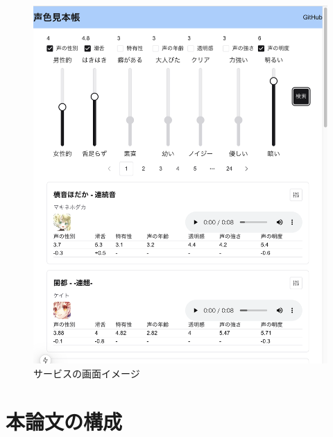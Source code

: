 \begin{figure}[h]
  \centering
  \includegraphics[width=0.9\linewidth]{fig/site_image.png}
  \caption{サービスの画面イメージ}
  \label{fig:site_image}
\end{figure}

\section{本論文の構成}

